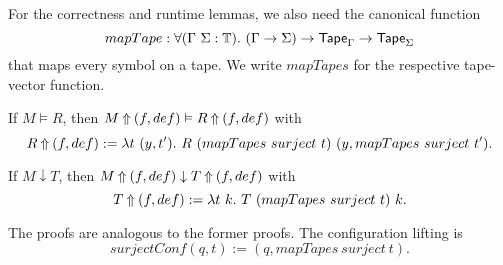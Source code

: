 For the correctness and runtime lemmas, we also need the canonical function
\[
  mapTape:\forall (\Gamma~\Sigma:\mathbb{T}).~(\Gamma\rightarrow\Sigma)\rightarrow\textsf{Tape}_\Gamma\rightarrow\textsf{Tape}_\Sigma
\]
that maps every symbol on a tape.  We write $mapTapes$ for the respective tape-vector function.

\begin{lemma}
  \label{lem:LiftAlphabet_Realise}
  If $M \vDash R$, then $M \mathbin{\Uparrow} (f,def) \vDash R \mathbin{\Uparrow} (f,def)$ with
  \[
    R \mathbin{\Uparrow} (f,def) := \lambda t~(y, t').~R~(mapTapes~surject~t)~(y, mapTapes~surject~t').
  \]
\end{lemma}

\begin{lemma}
  \label{lem:LiftAlphabet_TerminatesIn}
  If $M \downarrow T$, then $M \mathbin{\Uparrow} (f,def) \downarrow T \mathbin{\Uparrow} (f,def)$ with
  \[
    T \mathbin{\Uparrow} (f,def) := \lambda t~k.~T~(mapTapes~surject~t)~k.
  \]
\end{lemma}

The proofs are analogous to the former proofs.  The configuration lifting is
\[
  surjectConf (q,t) := (q, mapTapes~surject~t).
\]



